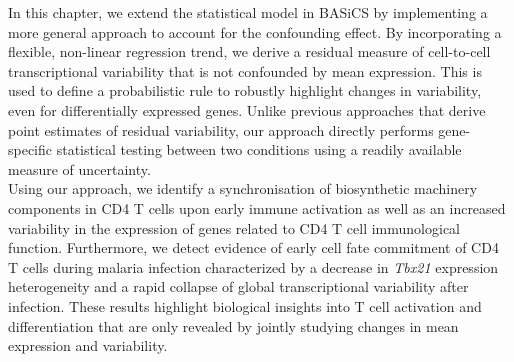 In this chapter, we extend the statistical model in BASiCS by implementing a more general approach to account for the confounding effect. By incorporating a flexible, non-linear regression trend, we derive a residual measure of cell-to-cell transcriptional variability that is not confounded by mean expression. This is used to define a probabilistic rule to robustly highlight changes in variability, even for differentially expressed genes. Unlike previous approaches that derive point estimates of residual variability, our approach directly performs gene-specific statistical testing between two conditions using a readily available measure of uncertainty. \\

Using our approach, we identify a synchronisation of  biosynthetic machinery components in CD4\plus{} T cells upon early immune activation as well as an increased variability in the expression of genes related to CD4\plus{} T cell immunological function.
Furthermore, we detect evidence of early cell fate commitment of CD4\plus{} T cells during malaria infection characterized by a decrease in \textit{Tbx21} expression heterogeneity and a rapid collapse of global transcriptional variability after infection. These results highlight biological insights into T cell activation and differentiation that are only revealed by jointly studying changes in mean expression and variability.
